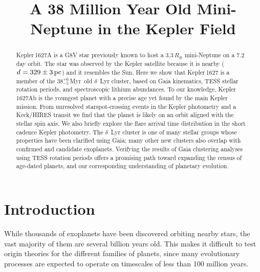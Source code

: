\documentclass[12pt,modern,twocolumn,tighten]{aastex63}
\newcommand{\clusterage}{$38^{+6}_{-5}$\,Myr} %
\begin{document}
\title{
  A 38 Million Year Old Mini-Neptune in the Kepler Field
}

\NewPageAfterKeywords


\begin{abstract}
  Kepler\,1627A is a G8V star previously known to host a
  $3.3\,R_\oplus$ mini-Neptune on a 7.2\,day orbit.  The star was
  observed by the Kepler satellite because it is nearby
  ($d=329\pm3\,{\rm pc}$) and it resembles the Sun.  Here we show that
  Kepler\,1627 is a member of the \clusterage\ old $\delta$~Lyr
  cluster, based on Gaia kinematics, TESS stellar rotation periods,
  and spectroscopic lithium abundances.  To our knowledge,
  Kepler\,1627Ab is the youngest planet with a precise age yet found
  by the main Kepler mission.  From unresolved starspot-crossing
  events in the Kepler photometry and a Keck/HIRES transit we find
  that the planet is likely on an orbit aligned with the stellar spin
  axis.  We also briefly explore the flare arrival time distribution
  in the short cadence Kepler photometry.  The $\delta$~Lyr cluster is
  one of many stellar groups whose properties have been clarified
  using Gaia; many other new clusters also overlap with confirmed and
  candidate exoplanets.  Verifying the results of Gaia clustering
  analyses using TESS rotation periods offers a promising path toward
  expanding the census of age-dated planets, and our corresponding
  understanding of planetary evolution.
\end{abstract}




\section{Introduction}

While thousands of exoplanets have been discovered orbiting nearby
stars, the vast majority of them are several billion years old.  This
makes it difficult to test origin theories for the different families
of planets, since many evolutionary processes are expected to operate
on timescales of less than 100 million years.
\end{document}
